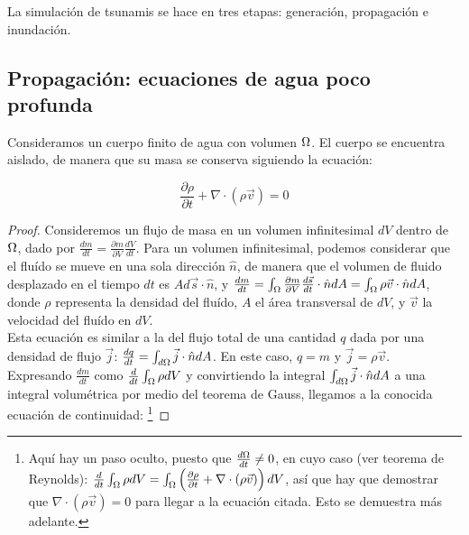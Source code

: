 \message{ !name(Tsunamis.tex)}\documentclass[TesisTotal.tex]{subfiles}
\begin{document}
La simulación de tsunamis se hace en tres etapas: generación, propagación e inundación.

\subsection{Propagación: ecuaciones de agua poco profunda}

Consideramos un cuerpo finito de agua con volumen $\Omega$.
El cuerpo se encuentra aislado, de manera que su masa se conserva siguiendo la ecuación:

\begin{equation}
\label{eq:continuidad}
  \frac{ \partial \rho}{\partial t} + \nabla \cdot (\rho \vec{v}) = 0
\end{equation}

\begin{proof} 
Consideremos un flujo de masa en un volumen infinitesimal $dV$ dentro de $\Omega$, dado por $\frac{dm}{dt} = \frac{\partial m}{\partial V} \frac{dV}{dt}$.
Para un volumen infinitesimal, podemos considerar que el fluído se mueve en una sola dirección $\hat{n}$, de manera que el volumen de fluido desplazado en el tiempo $dt$ es $A d\vec{s} \cdot \hat{n}$, y $\frac{dm}{dt} = \int_{\Omega} \frac{\partial m}{\partial V} \frac{d\vec{s}}{dt} \cdot \hat{n} {dA} = \int_{\Omega} \rho \vec{v} \cdot \hat{n} dA $, donde $\rho$ representa la densidad del fluído, $A$ el área transversal de $dV$, y $\vec{v}$ la velocidad del fluído en $dV$.\\
Esta ecuación es similar a la del flujo total de una cantidad $q$ dada por una densidad de flujo $\vec{j}$: $\frac{dq}{dt} = \int_{d\Omega} \vec{j} \cdot \hat{n} dA$. En este caso, $q = m$ y $\vec{j} = \rho \vec{v}$. \\
Expresando $\frac{dm}{dt}$ como $\frac{d}{dt} \int_\Omega \rho dV$ y convirtiendo la integral $\int_{d\Omega} \vec{j} \cdot \hat{n} dA$ a una integral volumétrica por medio del teorema de Gauss, llegamos a la conocida ecuación de continuidad: \footnote{Aquí hay un paso oculto, puesto que $\frac{d\Omega}{dt} \neq 0$, en cuyo caso (ver teorema de Reynolds):  $\frac{d}{dt} \int_\Omega \rho dV =\int_\Omega \left( \frac{\partial \rho}{\partial t} + \nabla \cdot (\rho \vec{v}) \right) dV$, así que hay que demostrar que $\nabla \cdot (\rho \vec{v}) = 0$ para llegar a la ecuación citada. Esto se demuestra más adelante. }

\end{proof}
\end{document}
